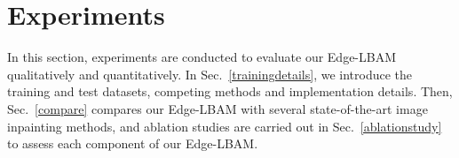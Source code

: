 \documentclass[10pt,journal,compsoc]{IEEEtran}
\begin{document}
\section{Experiments}\label{sec:exp}
%
In this section, experiments are conducted to evaluate our Edge-LBAM qualitatively and quantitatively.
%
In Sec.~\ref{trainingdetails}, we introduce the training and test datasets, competing methods and implementation details.
%
Then, Sec.~\ref{compare} compares our Edge-LBAM with several state-of-the-art image inpainting methods, and ablation studies are carried out in Sec.~\ref{ablationstudy} to assess each component of our Edge-LBAM.
%
%
%
	
\end{document}
